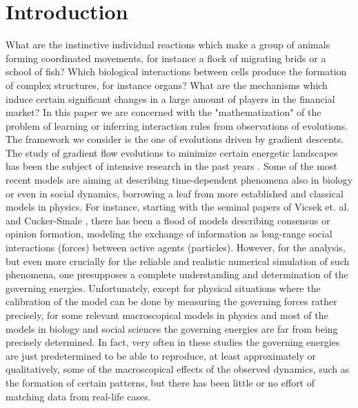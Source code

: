 \section{Introduction}

What are the instinctive individual reactions which make a group of animals forming coordinated movements, for instance a flock of migrating brids or a school of fish? Which biological interactions between cells produce the formation of complex structures, for instance organs? What are the mechanisms which induce certain significant changes in a large amount of players in the financial market? 
In this paper we are concerned with the "mathematization" of the problem of learning or inferring interaction rules from observations of evolutions. The framework we consider is the one of  evolutions driven by gradient descents.
The study of gradient flow evolutions to minimize  certain energetic landscapes has been the subject of intensive research in the past years \cite{AGS}. Some of the most recent models are  aiming at describing time-dependent phenomena also in biology or even in social dynamics, borrowing a leaf from more established and classical  models in physics. For instance, starting with the seminal papers of Vicsek et. al. \cite{VCBCS95} and Cucker-Smale \cite{CucSma07}, there has been a flood of models describing consensus or opinion formation,  modeling the exchange of information as long-range social interactions (forces) between active agents (particles). However, for the analysis, but even more crucially for the reliable and realistic numerical simulation of such phenomena, one presupposes a complete understanding and determination of the governing energies. Unfortunately, except for physical situations where the calibration of the model can be done by measuring the governing forces rather precisely, for some relevant macroscopical models in physics and most of the models in biology and social sciences the governing energies are far from being precisely determined. In fact, very often in these studies the governing energies are just predetermined to be able to reproduce, at least approximately or qualitatively, some of the macroscopical effects of the observed dynamics, such as the formation of certain patterns, but there has been little or no effort of matching data from real-life cases. 




